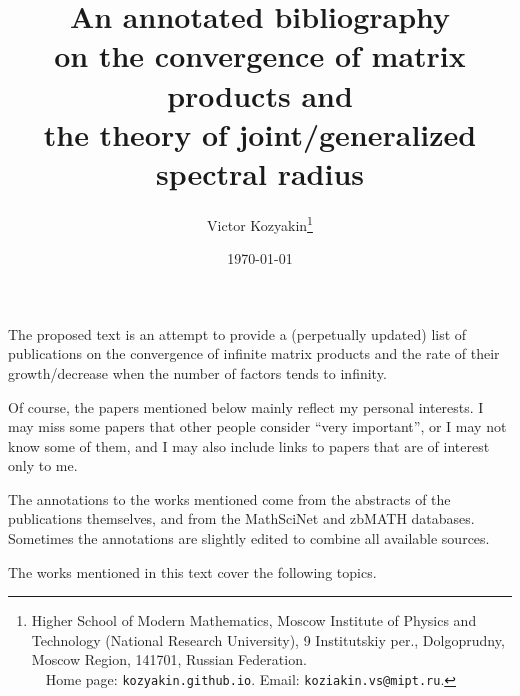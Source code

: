 \documentclass[a4paper,fleqn]{article}
\begin{document}
\title{\bf An annotated bibliography\\ on the convergence of matrix
  products and\\ the theory of joint/generalized spectral radius}

\author{Victor Kozyakin\thanks{Higher School of Modern Mathematics,
    Moscow Institute of Physics and Technology (National Research
    University), 9 Institutskiy per., Dolgoprudny, Moscow Region,
    141701, Russian Federation.\\\indent~~Home page:
    \nolinkurl{kozyakin.github.io}. Email: \nolinkurl{koziakin.vs@mipt.ru}.}}

\date{\today}

\maketitle

The proposed text is an attempt to provide a (perpetually updated) list
of publications on the convergence of infinite matrix products and the
rate of their growth/decrease when the number of factors tends to
infinity.

Of course, the papers mentioned below mainly reflect my personal
interests. I may miss some papers that other people consider ``very
important'', or I may not know some of them, and I may also include
links to papers that are of interest only to me.

The annotations to the works mentioned come from the abstracts of the
publications themselves, and from the MathSciNet and zbMATH databases.
Sometimes the annotations are slightly edited to combine all available
sources.

The works mentioned in this text cover the following topics.
\end{document}
